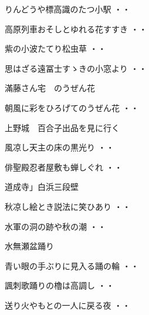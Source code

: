 \begin{shiika}りんどうや標高識のたつ小駅
\hfill{・・}\end{shiika}
\begin{shiika}高原列車おそしとゆれる花すすき
\hfill{・・}\end{shiika}
\begin{shiika}紫の小波たてり松虫草
\hfill{・・}\end{shiika}
\begin{shiika}思はざる遠冨士すゝきの小窓より
\hfill{・・}\end{shiika}
\vspace{ 0.4cm}
滿藤さん宅　のうぜん花
\begin{shiika}朝風に彩をひろげてのうぜん花
\hfill{・・}\end{shiika}
\vspace{ 0.4cm}
上野城　百合子出品を見に行く
\begin{shiika}風凉し天主の床の黒光り
\hfill{・・}\end{shiika}
\vspace{ 0.4cm}
\begin{shiika}俳聖殿忍者屋敷も蝉しぐれ
\hfill{・・}\end{shiika}
\vspace{ 0.4cm}
道成寺」白浜三段壁
\begin{shiika}秋凉し絵とき説法に笑ひあり
\hfill{・・}\end{shiika}
\begin{shiika}水軍の洞の跡や秋の潮
\hfill{・・}\end{shiika}
\vspace{ 0.4cm}
水無瀬盆踊り
\begin{shiika}青い眼の手ぶりに見入る踊の輪
\hfill{・・}\end{shiika}
\begin{shiika}諷刺歌踊りの櫓は高調し
\hfill{・・}\end{shiika}
\begin{shiika}送り火やもとの一人に戻る夜
\hfill{・・}\end{shiika}
